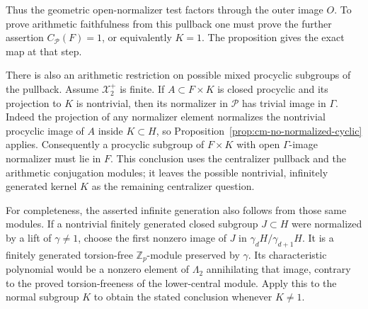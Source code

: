 Thus the geometric open-normalizer test factors through the
outer image \(O\).  To prove arithmetic faithfulness
from this pullback one must prove the further assertion
\(C_{\mathcal P}(F)=1\), or equivalently \(K=1\).
The proposition gives the exact map at that step.

There is also an arithmetic restriction on possible mixed
procyclic subgroups of the pullback.  Assume
\(\mathcal X_2^+\) is finite.  If \(A\subset F\times K\)
is closed procyclic and its projection to \(K\) is nontrivial,
then its normalizer in \(\mathcal P\) has trivial image
in \(\Gamma\).  Indeed the projection of any normalizer
element normalizes the nontrivial procyclic image of \(A\)
inside \(K\subset H\), so
Proposition~\ref{prop:cm-no-normalized-cyclic} applies.
Consequently a procyclic subgroup of \(F\times K\)
with open \(\Gamma\)-image normalizer must lie in \(F\).
This conclusion uses the centralizer pullback and
the arithmetic conjugation modules; it leaves the possible
nontrivial, infinitely generated kernel \(K\) as the
remaining centralizer question.

For completeness, the asserted infinite generation also
follows from those same modules.  If a nontrivial finitely
generated closed subgroup \(J\subset H\) were normalized
by a lift of \(\gamma\neq1\), choose the first nonzero
image of \(J\) in \(\gamma_dH/\gamma_{d+1}H\).
It is a finitely generated torsion-free
\(\mathbb Z_p\)-module preserved by \(\gamma\).
Its characteristic polynomial would be a nonzero
element of \(\Lambda_2\) annihilating that image,
contrary to the proved torsion-freeness of the
lower-central module.  Apply this to the normal subgroup
\(K\) to obtain the stated conclusion whenever \(K\neq1\).
